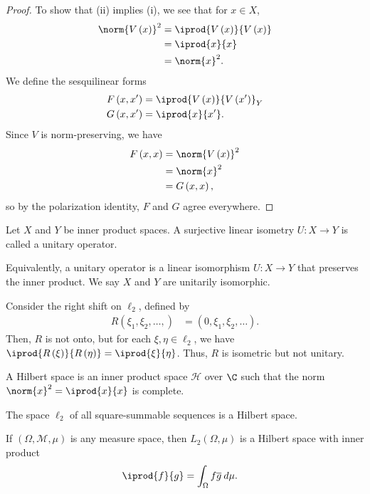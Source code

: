 \documentclass[10pt]{mypackage}
\begin{document}
\begin{proof}
  To show that (ii) implies (i), we see that for $x\in X$, 
  \begin{align*}
    \norm{V\left(x\right)}^2 &= \iprod{V\left(x\right)}{V\left(x\right)}\\
                &= \iprod{x}{x}\\
                &= \norm{x}^2.
  \end{align*}
  We define the sesquilinear forms
  \begin{align*}
    F\left(x,x'\right) &= \iprod{V\left(x\right)}{V\left(x'\right)}_{Y}\\
    G\left(x,x'\right) &= \iprod{x}{x'}.
  \end{align*}
  Since $V$ is norm-preserving, we have
  \begin{align*}
    F\left(x,x\right) &= \norm{V\left(x\right)}^2\\
                      &= \norm{x}^2\\
                      &= G\left(x,x\right),
  \end{align*}
  so by the polarization identity, $F$ and $G$ agree everywhere.
\end{proof}
\begin{definition}
  Let $X$ and $Y$ be inner product spaces. A surjective linear isometry $U: X\rightarrow Y$ is called a unitary operator.\newline

  Equivalently, a unitary operator is a linear isomorphism $U: X\rightarrow Y$ that preserves the inner product. We say $X$ and $Y$ are unitarily isomorphic.
\end{definition}
\begin{example}
  Consider the right shift on $\ell_2$, defined by
  \begin{align*}
    R\left(\xi_1,\xi_2,\dots,\right) &= \left(0,\xi_1,\xi_2,\dots\right).
  \end{align*}
  Then, $R$ is not onto, but for each $\xi,\eta\in \ell_2$, we have $ \iprod{R\left(\xi\right)}{R\left(\eta\right)} = \iprod{\xi}{\eta} $. Thus, $R$ is isometric but not unitary.
\end{example}
\begin{definition}
  A Hilbert space is an inner product space $\mathcal{H}$ over $\C$ such that the norm $\norm{x}^2 = \iprod{x}{x}$ is complete.
\end{definition}
\begin{example}
  The space $\ell_2$ of all square-summable sequences is a Hilbert space.
\end{example}
\begin{example}
  If $\left(\Omega,\mathcal{M},\mu\right)$ is any measure space, then $L_{2}\left(\Omega,\mu\right)$ is a Hilbert space with inner product
  \begin{align*}
    \iprod{f}{g} &= \int_{\Omega}^{} f\overline{g}\:d\mu.
  \end{align*}
  
\end{example}
\end{document}
